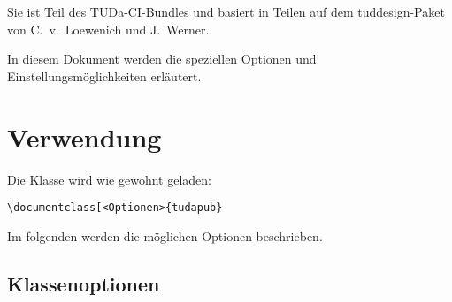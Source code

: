 \documentclass[
	ngerman,
	accentcolor=9c,%
	]{tudapub}
\begin{document}
Sie ist Teil des TUDa-CI-Bundles und basiert in Teilen auf dem tuddesign-Paket von C.~v.~Loewenich und J.~Werner.

In diesem Dokument werden die speziellen Optionen und Einstellungsmöglichkeiten erläutert.

\section{Verwendung}
Die Klasse wird wie gewohnt geladen:
\begin{verbatim}
\documentclass[<Optionen>{tudapub}
\end{verbatim}
Im folgenden werden die möglichen Optionen beschrieben.

\subsection{Klassenoptionen}
\end{document}
